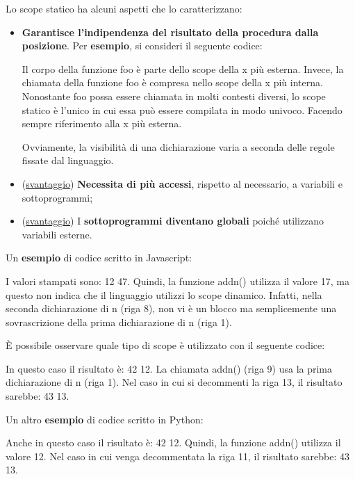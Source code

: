 \documentclass[a4paper]{article}
\begin{document}
 	Lo scope statico ha alcuni aspetti che lo caratterizzano:
 	\begin{itemize}
 		\item \textbf{Garantisce l'indipendenza del risultato della procedura dalla posizione}. Per \textcolor{Green4}{\textbf{esempio}}, si consideri il seguente codice:
 		
 		Il corpo della funzione \textsf{foo} è parte dello scope della \textsf{x} più esterna. Invece, la chiamata della funzione \textsf{foo} è compresa nello scope della \textsf{x} più interna. Nonostante \textsf{foo} possa essere chiamata in molti contesti diversi, lo scope statico è l'unico in cui essa può essere compilata in modo univoco. Facendo sempre riferimento alla \textsf{x} più esterna.
 		
 		Ovviamente, la visibilità di una dichiarazione varia a seconda delle regole fissate dal linguaggio.
 		
 		\item (\underline{svantaggio}) \textbf{Necessita di più accessi}, rispetto al necessario, a variabili e sottoprogrammi;
 		
 		\item (\underline{svantaggio}) I \textbf{sottoprogrammi diventano globali} poiché utilizzano variabili esterne.
 	\end{itemize}
 	Un \textcolor{Green4}{\textbf{esempio}} di codice scritto in Javascript:
 	
 	I valori stampati sono: 12 47. Quindi, la funzione \textsf{addn()} utilizza il valore 17, ma questo non indica che il linguaggio utilizzi lo scope dinamico. Infatti, nella seconda dichiarazione di \textsf{n} (riga 8), non vi è un blocco ma semplicemente una sovrascrizione della prima dichiarazione di \textsf{n} (riga 1).\newpage
 	
 	\noindent
 	È possibile osservare quale tipo di scope è utilizzato con il seguente codice:
 	
 	In questo caso il risultato è: 42 12. La chiamata \textsf{addn()} (riga 9) usa la prima dichiarazione di \textsf{n} (riga 1). Nel caso in cui si decommenti la riga 13, il risultato sarebbe: 43 13. \newline
 	
 	\noindent
 	Un altro \textcolor{Green4}{\textbf{esempio}} di codice scritto in Python:
 	
 	Anche in questo caso il risultato è: 42 12. Quindi, la funzione \textsf{addn()} utilizza il valore 12. Nel caso in cui venga decommentata la riga 11, il risultato sarebbe: 43 13.\newline
 	
\end{document}
